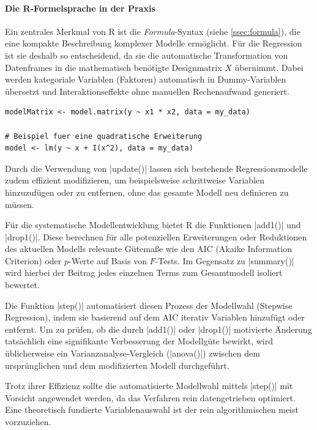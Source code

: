 \documentclass[10pt,twocolumn]{scrartcl}
\renewcommand{\lstinline}{\mycoloredinline}
\begin{document}
\paragraph{Die R-Formelsprache in der Praxis}

Ein zentrales Merkmal von R ist die \emph{Formula}-Syntax (siehe \ref{ssec:formula}), die eine kompakte Beschreibung komplexer Modelle ermöglicht. Für die Regression ist sie deshalb so entscheidend, da sie die automatische Transformation von Datenframes in die mathematisch benötigte Designmatrix $X$ übernimmt. Dabei werden kategoriale Variablen (Faktoren) automatisch in Dummy-Variablen übersetzt und Interaktionseffekte ohne manuellen Rechenaufwand generiert.

\begin{lstlisting}
modelMatrix <- model.matrix(y ~ x1 * x2, data = my_data)

# Beispiel fuer eine quadratische Erweiterung
model <- lm(y ~ x + I(x^2), data = my_data)
\end{lstlisting}

Durch die Verwendung von \lstinline|update()| lassen sich bestehende Regressionsmodelle zudem effizient modifizieren, um beispielsweise schrittweise Variablen hinzuzufügen oder zu entfernen, ohne das gesamte Modell neu definieren zu müssen.

Für die systematische Modellentwicklung bietet R die Funktionen \lstinline|add1()| und \lstinline|drop1()|. Diese berechnen für alle potenziellen Erweiterungen oder Reduktionen des aktuellen Modells relevante Gütemaße wie den AIC (Akaike Information Criterion) oder $p$-Werte auf Basis von $F$-Tests. Im Gegensatz zu \lstinline|summary()| wird hierbei der Beitrag jedes einzelnen Terms zum Gesamtmodell isoliert bewertet.

Die Funktion \lstinline|step()| automatisiert diesen Prozess der Modellwahl (Stepwise Regression), indem sie basierend auf dem AIC iterativ Variablen hinzufügt oder entfernt. Um zu prüfen, ob die durch \lstinline|add1()| oder \lstinline|drop1()| motivierte Änderung tatsächlich eine signifikante Verbesserung der Modellgüte bewirkt, wird üblicherweise ein Varianzanalyse-Vergleich (\lstinline|anova()|) zwischen dem ursprünglichen und dem modifizierten Modell durchgeführt.

Trotz ihrer Effizienz sollte die automatisierte Modellwahl mittels \lstinline|step()| mit Vorsicht angewendet werden, da das Verfahren rein datengetrieben optimiert. Eine theoretisch fundierte Variablenauswahl ist der rein algorithmischen meist vorzuziehen.
\end{document}

